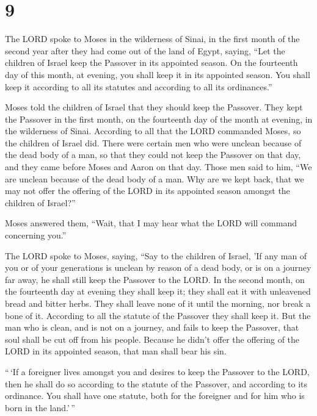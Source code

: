 \hypertarget{section-8}{%
\section{9}\label{section-8}}

 The LORD spoke to Moses in the wilderness of Sinai, in the
first month of the second year after they had come out of the land of
Egypt, saying,  ``Let the children of Israel keep the
Passover in its appointed season.  On the fourteenth day of
this month, at evening, you shall keep it in its appointed season. You
shall keep it according to all its statutes and according to all its
ordinances.''

 Moses told the children of Israel that they should keep the
Passover.  They kept the Passover in the first month, on the
fourteenth day of the month at evening, in the wilderness of Sinai.
According to all that the LORD commanded Moses, so the children of
Israel did.  There were certain men who were unclean because
of the dead body of a man, so that they could not keep the Passover on
that day, and they came before Moses and Aaron on that day. 
Those men said to him, ``We are unclean because of the dead body of a
man. Why are we kept back, that we may not offer the offering of the
LORD in its appointed season amongst the children of Israel?''

 Moses answered them, ``Wait, that I may hear what the LORD
will command concerning you.''

 The LORD spoke to Moses, saying,  ``Say to the
children of Israel, 'If any man of you or of your generations is unclean
by reason of a dead body, or is on a journey far away, he shall still
keep the Passover to the LORD.  In the second month, on the
fourteenth day at evening they shall keep it; they shall eat it with
unleavened bread and bitter herbs.  They shall leave none
of it until the morning, nor break a bone of it. According to all the
statute of the Passover they shall keep it.  But the man
who is clean, and is not on a journey, and fails to keep the Passover,
that soul shall be cut off from his people. Because he didn't offer the
offering of the LORD in its appointed season, that man shall bear his
sin.

 ``\,`If a foreigner lives amongst you and desires to keep
the Passover to the LORD, then he shall do so according to the statute
of the Passover, and according to its ordinance. You shall have one
statute, both for the foreigner and for him who is born in the
land.'\,''


